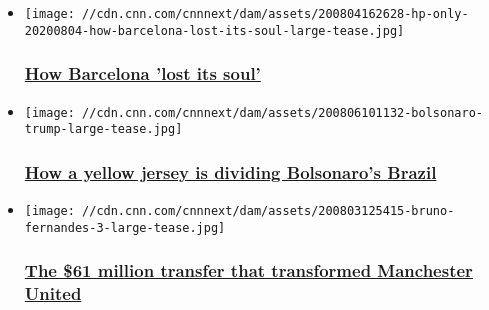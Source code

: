 \begin{itemize}
\item
  \href{/2020/08/07/football/barcelona-napoli-champions-league-lionel-messi-spt-intl-cmd/index.html}{}

  \texttt{[image: //cdn.cnn.com/cnnnext/dam/assets/200804162628-hp-only-20200804-how-barcelona-lost-its-soul-large-tease.jpg]}

  \hypertarget{how-barcelona-lost-its-soul}{%
  \subsubsection{\texorpdfstring{\href{/2020/08/07/football/barcelona-napoli-champions-league-lionel-messi-spt-intl-cmd/index.html}{How
  Barcelona 'lost its
  soul'}}{How Barcelona 'lost its soul'}}\label{how-barcelona-lost-its-soul}}
\item
  \href{/2020/08/06/football/bolsonaro-brazil-foootball-yellow-shirt-cmd-spt-intl/index.html}{}

  \texttt{[image: //cdn.cnn.com/cnnnext/dam/assets/200806101132-bolsonaro-trump-large-tease.jpg]}

  \hypertarget{how-a-yellow-jersey-is-dividing-bolsonaros-brazil}{%
  \subsubsection{\texorpdfstring{\href{/2020/08/06/football/bolsonaro-brazil-foootball-yellow-shirt-cmd-spt-intl/index.html}{How
  a yellow jersey is dividing Bolsonaro's
  Brazil}}{How a yellow jersey is dividing Bolsonaro's Brazil}}\label{how-a-yellow-jersey-is-dividing-bolsonaros-brazil}}
\item
  \href{/2020/08/04/football/manchester-united-bruno-fernandes-europa-league-cmd-spt-intl/index.html}{}

  \texttt{[image: //cdn.cnn.com/cnnnext/dam/assets/200803125415-bruno-fernandes-3-large-tease.jpg]}

  \hypertarget{the-61-million-transfer-that-transformed-manchester-united-}{%
  \subsubsection{\texorpdfstring{\href{/2020/08/04/football/manchester-united-bruno-fernandes-europa-league-cmd-spt-intl/index.html}{The
  \$61 million transfer that transformed Manchester United
  }}{The \$61 million transfer that transformed Manchester United }}\label{the-61-million-transfer-that-transformed-manchester-united-}}
\end{itemize}

